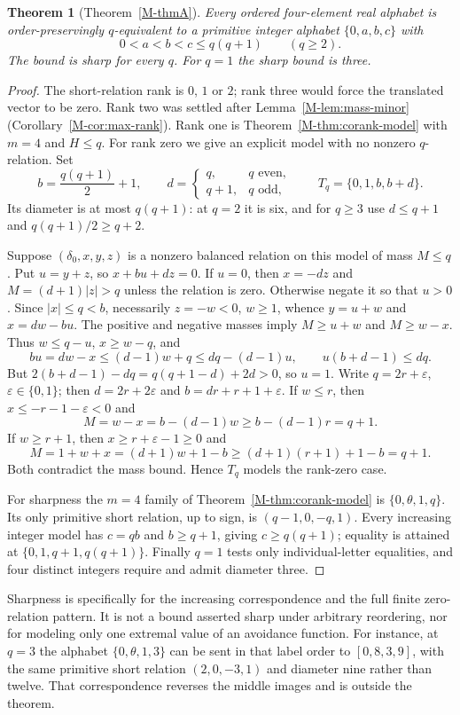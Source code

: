 \documentclass[11pt,reqno]{amsart}
\theoremstyle{plain}
\newtheorem{theorem}{Theorem}[section]
\theoremstyle{definition}
\theoremstyle{plain}
\theoremstyle{plain}
\theoremstyle{plain}
\theoremstyle{plain}
\theoremstyle{plain}
\theoremstyle{plain}
\theoremstyle{definition}
\theoremstyle{definition}
\theoremstyle{definition}
\theoremstyle{plain}
\begin{document}
\begin{theorem}[Theorem~\ref{M-thmA}]\label{M-thm:sharp-four-model}
Every ordered four-element real alphabet is order-preservingly $q$-equivalent
to a primitive integer alphabet $\{0,a,b,c\}$ with
\[
0<a<b<c\le q(q+1)\qquad(q\ge2).
\]
The bound is sharp for every $q$. For $q=1$ the sharp bound is three.
\end{theorem}
\begin{proof}
The short-relation rank is $0$, $1$ or $2$; rank three would force the
translated vector to be zero. Rank two was settled after
Lemma~\ref{M-lem:mass-minor} (Corollary~\ref{M-cor:max-rank}).
Rank one is Theorem~\ref{M-thm:corank-model} with $m=4$ and $H\le q$.
For rank zero we give an explicit model with no nonzero $q$-relation. Set
\[
 b=\frac{q(q+1)}2+1,\qquad
 d=\begin{cases}q,&q\text{ even},\\q+1,&q\text{ odd},\end{cases}
 \qquad T_q=\{0,1,b,b+d\}.
\]
Its diameter is at most $q(q+1)$: at $q=2$ it is six, and for $q\ge3$
use $d\le q+1$ and $q(q+1)/2\ge q+2$.

Suppose $(\delta_0,x,y,z)$ is a nonzero balanced relation on this model
of mass $M\le q$. Put $u=y+z$, so $x+bu+dz=0$.
If $u=0$, then $x=-dz$ and $M=(d+1)|z|>q$ unless the relation is zero.
Otherwise negate it so that $u>0$. Since $|x|\le q<b$, necessarily
$z=-w<0$, $w\ge1$, whence $y=u+w$ and $x=dw-bu$.
The positive and negative masses imply $M\ge u+w$ and $M\ge w-x$.
Thus $w\le q-u$, $x\ge w-q$, and
\[
 bu=dw-x\le(d-1)w+q\le dq-(d-1)u,
 \qquad u(b+d-1)\le dq.
\]
But $2(b+d-1)-dq=q(q+1-d)+2d>0$, so $u=1$.
Write $q=2r+\varepsilon$, $\varepsilon\in\{0,1\}$; then
$d=2r+2\varepsilon$ and $b=dr+r+1+\varepsilon$.
If $w\le r$, then $x\le-r-1-\varepsilon<0$ and
\[
 M=w-x=b-(d-1)w\ge b-(d-1)r=q+1.
\]
If $w\ge r+1$, then $x\ge r+\varepsilon-1\ge0$ and
\[
 M=1+w+x=(d+1)w+1-b\ge(d+1)(r+1)+1-b=q+1.
\]
Both contradict the mass bound. Hence $T_q$ models the rank-zero case.

For sharpness the $m=4$ family of Theorem~\ref{M-thm:corank-model} is
$\{0,\theta,1,q\}$. Its only primitive short relation, up to sign,
is $(q-1,0,-q,1)$. Every increasing integer model has $c=qb$ and
$b\ge q+1$, giving $c\ge q(q+1)$; equality is attained at
$\{0,1,q+1,q(q+1)\}$. Finally $q=1$ tests only individual-letter
equalities, and four distinct integers require and admit diameter three.
\end{proof}

Sharpness is specifically for the increasing correspondence and the full
finite zero-relation pattern. It is not a bound asserted sharp under arbitrary
reordering, nor for modeling only one extremal value of an avoidance
function. For instance, at
$q=3$ the alphabet $\{0,\theta,1,3\}$ can be sent in that label order to
$[0,8,3,9]$, with the same primitive short relation $(2,0,-3,1)$ and
diameter nine rather than twelve. That correspondence reverses the middle
images and is outside the theorem.
\end{document}
